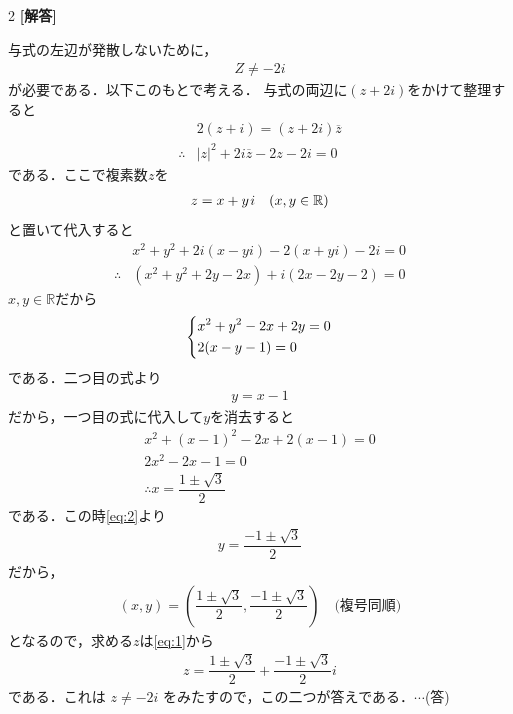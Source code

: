 \documentclass[../../main.tex]{subfiles}
\begin{document}
\setcounter{equation}{0}
\begin{oframed}
  
\end{oframed}
\setlength{\columnseprule}{0.4pt}
\begin{multicols}{2}
  {\bf [解答]}

  与式の左辺が発散しないために，
  \begin{align}
    Z \neq -2i
  \end{align}
  が必要である．以下このもとで考える．
  与式の両辺に$(z+2i)$をかけて整理すると
  \begin{align}
    & 2(z+i) = (z+2i)\overline{z}          \\
    \therefore
    & |z|^2 + 2i\overline{z} - 2z - 2i = 0
  \end{align}
  である．ここで複素数$z$を
  \begin{align}
    z = x+y\kern1pt i \quad (x,y \in \mathbb{R}) \label{eq:1}
  \end{align}
  と置いて代入すると
  \begin{align}
    & x^2+y^2 + 2i(x-yi) - 2(x+yi) - 2i = 0 \\
    \therefore
    & (x^2+y^2+2y-2x) + i(2x-2y-2) = 0
  \end{align}
  $x,y \in \mathbb{R}$だから
  \begin{align}
    \begin{dcases}
      x^2+y^2-2x+2y=0 \\
      2(x-y-1)=0
    \end{dcases}
  \end{align}
  である．二つ目の式より
  \begin{align}
    y=x-1 \label{eq:2}
  \end{align}
  だから，一つ目の式に代入して$y$を消去すると
  \begin{align}
    x^2+(x-1)^2-2x+2(x-1)=0 \\
    2x^2-2x-1=0             \\
    \therefore
    x = \dfrac{1\pm\sqrt{3}}{2}
  \end{align}
  である．この時\cref{eq:2}より
  \begin{align}
    y = \dfrac{-1\pm\sqrt{3}}{2}
  \end{align}
  だから，
  \begin{align}
    (x,y) = \left(\dfrac{1\pm\sqrt{3}}{2}, \dfrac{-1\pm\sqrt{3}}{2}\right)\quad \text{(複号同順)}
  \end{align}
  となるので，求める$z$は\cref{eq:1}から
  \begin{align}
    z = \dfrac{1\pm\sqrt{3}}{2} + \dfrac{-1\pm\sqrt{3}}{2}i
  \end{align}
  である．これは $z \neq -2i$ をみたすので，この二つが答えである．$\cdots$(答)


\end{multicols}
\end{document}
